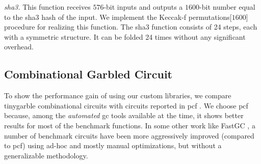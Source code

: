 \textit{\acrshort{sha}3.} This function receives $576$-bit inputs and outputs a $1600$-bit number equal to the \acrshort{sha}3 hash of the input.
We implement the Keccak-f permutations[$1600$] procedure for realizing this function.
The \acrshort{sha}3 function consists of 24 steps, each with a symmetric structure.
It can be folded 24 times without any significant overhead.

\subsection{Combinational Garbled Circuit}\label{ssec:eval-tinygarble-comb}
To show the performance gain of using our custom libraries, we compare \gls{tinygarble} combinational circuits with circuits reported in \gls{pcf} \cite{kreuter2013pcf}.
We choose \gls{pcf} because, among the \emph{automated} \acrshort{gc} tools available at the time, it shows better results for most of the benchmark functions.
In some other work like FastGC \cite{huang2011faster}, a number of benchmark circuits have been more aggressively improved (compared to \gls{pcf}) using ad-hoc and mostly manual optimizations, but without a generalizable methodology.

